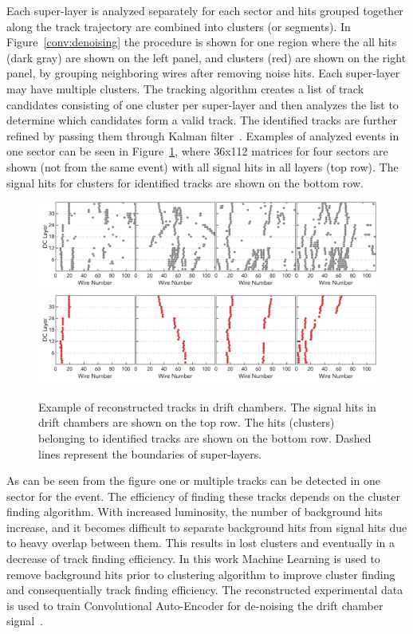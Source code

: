 Each super-layer is analyzed separately for each sector and hits grouped together along the track trajectory 
are combined into clusters (or segments). In Figure~\ref{conv:denoising} the procedure is shown for one
region where the all hits (dark gray) are shown on the left panel, and clusters (red) are shown on the right panel,
by grouping neighboring wires after removing noise hits. Each super-layer
may have multiple clusters. The tracking algorithm creates a list of track candidates consisting of one cluster 
per super-layer and then analyzes the list to determine which candidates form a valid track. The identified 
tracks are further refined by passing them through Kalman filter~\cite{Kalman1960}. 
Examples of analyzed events in one sector can be seen in Figure~\ref{conv:trackfinding}, where 36x112 matrices
for four sectors are shown (not from the same event) with all signal hits in all layers (top row). The signal hits 
for clusters for identified tracks are shown on the bottom row. 


 \begin{figure}[!h]
\begin{center}
 \includegraphics[width=6.0in]{images/dc_example_all_hits.pdf}
 \includegraphics[width=6.0in]{images/dc_example_track_hits.pdf}
\caption {Example of reconstructed tracks in drift chambers. The signal hits in drift chambers are shown 
on the top row. The hits (clusters) belonging to identified tracks are shown on the bottom row. Dashed 
lines represent the boundaries of super-layers.}
 \label{conv:trackfinding}
 \end{center}
\end{figure}

As can be seen from the figure one or multiple tracks can be detected in one sector for the event. The efficiency
of finding these tracks depends on the cluster finding algorithm. With increased luminosity, the number of background 
hits increase, and it becomes difficult to separate background hits from signal hits due to heavy overlap between them.
This results in lost clusters and eventually in a decrease of track finding efficiency. 
In this work Machine Learning is used to remove background hits prior to clustering algorithm to improve cluster 
finding and consequentially track finding efficiency. The reconstructed experimental data is used to train Convolutional
Auto-Encoder for de-noising the drift chamber signal~\cite{Thomadakis:2022zcd}.

